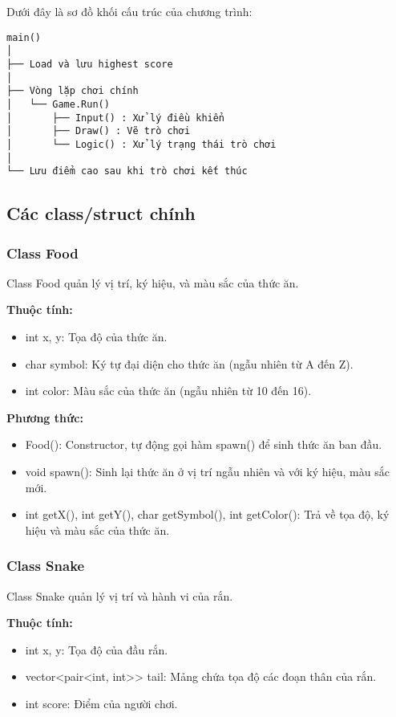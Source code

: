 \documentclass[a4paper,12pt]{article}
\begin{document}
Dưới đây là sơ đồ khối cấu trúc của chương trình:

\begin{verbatim}
main()
│
├── Load và lưu highest score
│
├── Vòng lặp chơi chính
│   └── Game.Run() 
│       ├── Input() : Xử lý điều khiển
│       ├── Draw() : Vẽ trò chơi
│       └── Logic() : Xử lý trạng thái trò chơi
│
└── Lưu điểm cao sau khi trò chơi kết thúc
\end{verbatim}

\subsection{Các class/struct chính}

\subsubsection{Class Food}
Class Food quản lý vị trí, ký hiệu, và màu sắc của thức ăn.

\textbf{Thuộc tính:}
\begin{itemize}
    \item int x, y: Tọa độ của thức ăn.
    \item char symbol: Ký tự đại diện cho thức ăn (ngẫu nhiên từ A đến Z).
    \item int color: Màu sắc của thức ăn (ngẫu nhiên từ 10 đến 16).
\end{itemize}

\textbf{Phương thức:}
\begin{itemize}
    \item Food(): Constructor, tự động gọi hàm spawn() để sinh thức ăn ban đầu.
    \item void spawn(): Sinh lại thức ăn ở vị trí ngẫu nhiên và với ký hiệu, màu sắc mới.
    \item int getX(), int getY(), char getSymbol(), int getColor(): Trả về tọa độ, ký hiệu và màu sắc của thức ăn.
\end{itemize}

\subsubsection{Class Snake}
Class Snake quản lý vị trí và hành vi của rắn.

\textbf{Thuộc tính:}
\begin{itemize}
    \item int x, y: Tọa độ của đầu rắn.
    \item vector<pair<int, int>> tail: Mảng chứa tọa độ các đoạn thân của rắn.
    \item int score: Điểm của người chơi.
\end{itemize}
\end{document}

